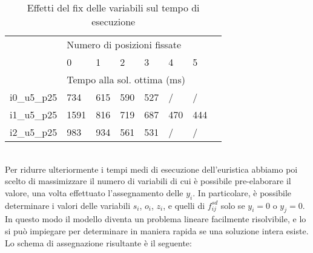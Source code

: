 \begin{table}[]
	\centering
	\begin{tabular}{@{}llllllll@{}}
		\cmidrule(r){1-7}
		& \multicolumn{6}{l}{Numero di posizioni fissate}                                                                                             &  \\ \cmidrule(r){1-7}
		& \multicolumn{1}{l|}{0}    & \multicolumn{1}{l|}{1}   & \multicolumn{1}{l|}{2}   & \multicolumn{1}{l|}{3}   & \multicolumn{1}{l|}{4}   & 5   &  \\
		& \multicolumn{6}{l}{Tempo alla sol. ottima (ms)}                                                                                             &  \\ \cmidrule(r){1-7}
		i0\_u5\_p25 & \multicolumn{1}{l|}{734}  & \multicolumn{1}{l|}{615} & \multicolumn{1}{l|}{590} & \multicolumn{1}{l|}{527} & \multicolumn{1}{l|}{/}   & /   &  \\ \cmidrule(r){1-7}
		i1\_u5\_p25 & \multicolumn{1}{l|}{1591} & \multicolumn{1}{l|}{816} & \multicolumn{1}{l|}{719} & \multicolumn{1}{l|}{687} & \multicolumn{1}{l|}{470} & 444 &  \\ \cmidrule(r){1-7}
		i2\_u5\_p25 & \multicolumn{1}{l|}{983}  & \multicolumn{1}{l|}{934} & \multicolumn{1}{l|}{561} & \multicolumn{1}{l|}{531} & \multicolumn{1}{l|}{/}   & /   &  \\ \cmidrule(r){1-7}
	\end{tabular}
	\caption{Effetti del fix delle variabili sul tempo di esecuzione}
	\label{tab:fix}
\end{table}
%
\\Per ridurre ulteriormente i tempi medi di esecuzione dell'euristica abbiamo poi scelto di massimizzare il numero di variabili di cui è possibile pre-elaborare il valore, una volta effettuato l'assegnamento delle $y_i$. In particolare, è possibile determinare i valori delle variabili $s_i$, $o_i$, $z_i$, e quelli di $f_{ij}^{sd}$ solo se $y_i = 0$ o $y_j = 0$. In questo modo il modello diventa un problema lineare facilmente risolvibile, e lo si può impiegare per determinare in maniera rapida se una soluzione intera esiste.\\
Lo schema di assegnazione risultante è il seguente: 
